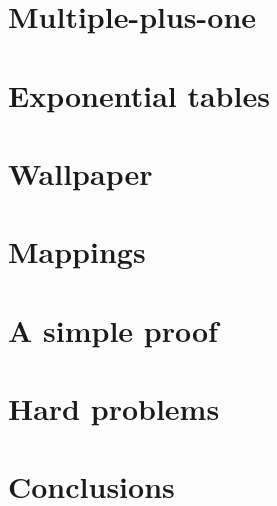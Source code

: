 \documentclass{article}
\begin{document}
\newpage
\section{Multiple-plus-one}


\newpage
\section{Exponential tables}


\newpage
\section{Wallpaper}


\newpage
\section{Mappings}


\newpage
\section{A simple proof}


\newpage
\section{Hard problems}


\newpage
\section{Conclusions}


\newpage

\end{document}
